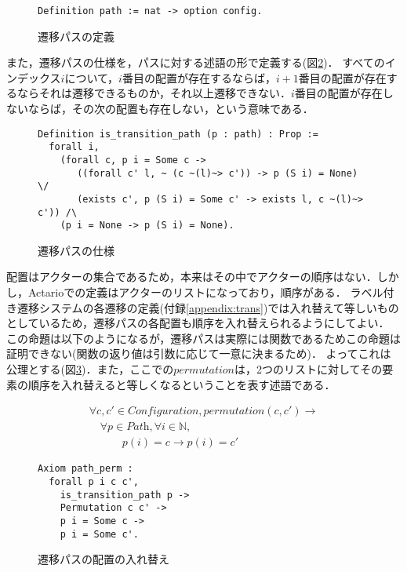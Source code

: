 \begin{figure}[tp]
\begin{lstlisting}
Definition path := nat -> option config.
\end{lstlisting}
  \caption{遷移パスの定義}\label{code:formalization:path}
\end{figure}

また，遷移パスの仕様を，パスに対する述語の形で定義する(図\ref{code:formalization:path-spec})．
すべてのインデックス$i$について，$i$番目の配置が存在するならば，$i+1$番目の配置が存在するならそれは遷移できるものか，それ以上遷移できない．$i$番目の配置が存在しないならば，その次の配置も存在しない，という意味である．

\begin{figure}[tp]
\begin{lstlisting}
Definition is_transition_path (p : path) : Prop :=
  forall i,
    (forall c, p i = Some c ->
       ((forall c' l, ~ (c ~(l)~> c')) -> p (S i) = None) \/
       (exists c', p (S i) = Some c' -> exists l, c ~(l)~> c')) /\
    (p i = None -> p (S i) = None).
\end{lstlisting}
  \caption{遷移パスの仕様}\label{code:formalization:path-spec}
\end{figure}

配置はアクターの集合であるため，本来はその中でアクターの順序はない．しかし，Actarioでの定義はアクターのリストになっており，順序がある．
ラベル付き遷移システムの各遷移の定義(付録\ref{appendix:trans})では入れ替えて等しいものとしているため，遷移パスの各配置も順序を入れ替えられるようにしてよい．
この命題は以下のようになるが，遷移パスは実際には関数であるためこの命題は証明できない(関数の返り値は引数に応じて一意に決まるため)．
よってこれは公理とする(図\ref{code:proof:path-perm})．また，ここでの$permutation$は，2つのリストに対してその要素の順序を入れ替えると等しくなるということを表す述語である．

\begin{displaymath}
  \begin{array}{l}
    \forall c, c' \in \textit{Configuration}, permutation(c, c') \rightarrow \\
    \quad \forall p \in \textit{Path}, \forall i \in \mathbb{N}, \\
    \quad \quad \quad p(i) = c \rightarrow p(i) = c'
  \end{array}
\end{displaymath}

\begin{figure}[tp]
\begin{lstlisting}
Axiom path_perm :
  forall p i c c',
    is_transition_path p ->
    Permutation c c' ->
    p i = Some c ->
    p i = Some c'.
\end{lstlisting}
  \caption{遷移パスの配置の入れ替え}\label{code:proof:path-perm}
\end{figure}

